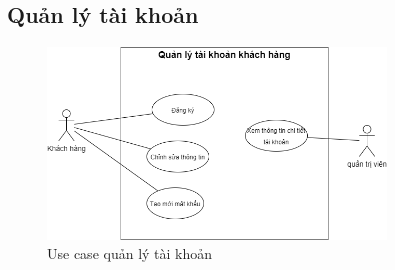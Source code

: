    \newpage         
    
   
   \subsection{Quản lý tài khoản}
        \begin{figure}[!htp]
            \centering
            \includegraphics[width=9cm]{img/UseCase/UseCase-Quản lý tài khoản.drawio.png}
            \newline
         \caption{Use case quản lý tài khoản}
        \end{figure}
        
